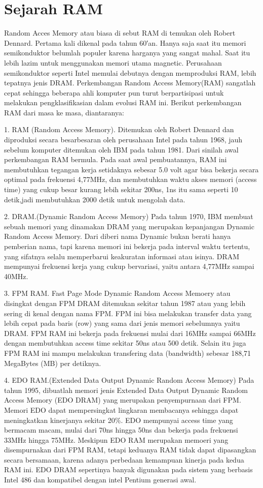 \section{Sejarah RAM}
Random Acces Memory atau biasa di sebut RAM di temukan oleh Robert Dennard.
Pertama kali dikenal pada tahun 60′an. Hanya saja saat itu memori semikonduktor belumlah populer karena harganya yang sangat mahal. Saat itu lebih lazim untuk menggunakan memori utama magnetic. Perusahaan semikonduktor seperti Intel memulai debutnya dengan memproduksi RAM, lebih tepatnya jenis DRAM. 
Perkembangan Random Access Memory(RAM) sangatlah cepat sehingga beberapa ahli komputer pun turut berpartisipasi untuk melakukan pengklasifikasian dalam evolusi RAM ini. 
Berikut perkembangan RAM dari masa ke masa, diantaranya:

1.	RAM (Random Access Memory). Ditemukan oleh Robert Dennard dan diproduksi secara besar\-besaran oleh perusahaan Intel pada tahun 1968, jauh sebelum komputer ditemukan oleh IBM pada tahun 1981. Dari sinilah awal perkembangan RAM bermula. Pada saat awal pembuatannya, RAM ini membutuhkan tegangan kerja setidaknya sebesar 5.0 volt agar bisa bekerja secara optimal pada frekuensi 4,77MHz, dan membutuhkan waktu akses memori (access time) yang cukup besar kurang lebih sekitar 200ns, 1ns itu sama seperti 10 detik,jadi membutuhkan 2000 detik untuk mengolah data.

2.	DRAM.(Dynamic Random Access Memory) Pada tahun 1970, IBM membuat sebuah memori yang dinamakan DRAM yang merupakan kepanjangan Dynamic Random Access Memory. Dari diberi nama Dynamic bukan berati hanya pemberian nama, tapi karena memori ini bekerja pada interval waktu tertentu, yang sifatnya selalu memperbarui keakuratan informasi atau isinya. DRAM mempunyai frekuensi kerja yang cukup bervariasi, yaitu antara 4,77MHz sampai 40MHz. 

3.	FPM RAM. Fast Page Mode Dynamic Random Access Memoery atau disingkat dengan FPM DRAM ditemukan sekitar tahun 1987 atau yang lebih sering di kenal dengan nama FPM. FPM ini bisa melakukan transfer data yang lebih cepat pada baris (row) yang sama dari jenis memori sebelumnya yaitu DRAM. FPM RAM ini bekerja pada frekuensi mulai dari 16MHz sampai 66MHz dengan membutuhkan access time sekitar 50ns atau 500 detik. Selain itu juga FPM RAM ini mampu melakukan transfering data (bandwidth) sebesar 188,71 MegaBytes (MB) per detiknya.

4.	EDO RAM.(Extended Data Output Dynamic Random Access Memory) Pada tahun 1995, dibuatlah memori jenis Extended Data Output Dynamic Random Access Memory (EDO DRAM) yang merupakan penyempurnaan dari FPM. Memori EDO dapat mempersingkat lingkaran membacanya sehingga dapat meningkatkan kinerjanya sekitar 20\%. EDO mempunyai access time yang bermacam macam, mulai dari 70ns hingga 50ns dan bekerja  pada frekuensi 33MHz hingga 75MHz. Meskipun EDO RAM merupakan memoeri yang disempurnakan dari FPM RAM, tetapi keduanya RAM tidak dapat dipasangkan secara bersamaan, karena adanya perbedaan kemampuan kinerja pada kedua RAM ini. EDO DRAM sepertinya banyak digunakan pada sistem yang berbasis Intel 486 dan kompatibel dengan intel Pentium generasi awal.

